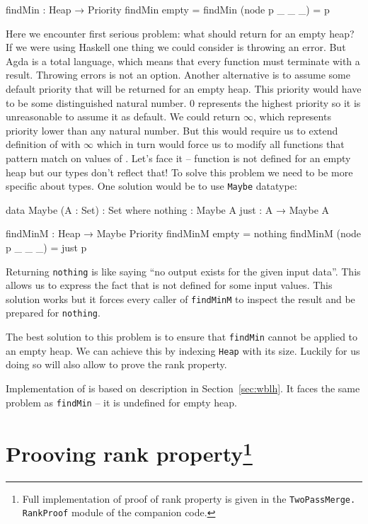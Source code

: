 \begin{code}
findMin : Heap → Priority
findMin empty          = 
findMin (node p _ _ _) = p
\end{code}
\noindent
Here we encounter first serious problem: what should \findMin return for an empty heap? If we were using Haskell one thing we could consider is throwing an error. But Agda is a total language, which means that every function must terminate with a result. Throwing errors is not an option. Another alternative is to assume some default priority that will be returned for an empty heap. This priority would have to be some distinguished natural number. $0$ represents the highest priority so it is unreasonable to assume it as default. We could return $\infty$, which represents priority lower than any natural number. But this would require us to extend definition of \Nat with $\infty$ which in turn would force us to modify all functions that pattern match on values of \Nat. Let's face it -- \findMin function is not defined for an empty heap but our types don't reflect that! To solve this problem we need to be more specific about types. One solution would be to use \texttt{Maybe} datatype:

\begin{code}
data Maybe (A : Set) : Set where
  nothing : Maybe A
  just    : A → Maybe A

findMinM : Heap → Maybe Priority
findMinM empty          = nothing
findMinM (node p _ _ _) = just p
\end{code}

\noindent
Returning \texttt{nothing} is like saying ``no output exists for the given input data''. This allows us to express the fact that \findMin is not defined for some input values. This solution works but it forces every caller of \texttt{findMinM} to inspect the result and be prepared for \texttt{nothing}.

The best solution to this problem is to ensure that \texttt{findMin} cannot be applied to an empty heap. We can achieve this by indexing \texttt{Heap} with its size. Luckily for us doing so will also allow to prove the rank property.

Implementation of \deleteMin is based on description in Section~\ref{sec:wblh}. It faces the same problem as \texttt{findMin} -- it is undefined for empty heap.

\section[Prooving rank property]{Prooving rank property\footnote{Full implementation of proof of rank property is given in the \texttt{TwoPassMerge.} \texttt{RankProof} module of the companion code.}}\label{sec:rank-property}

